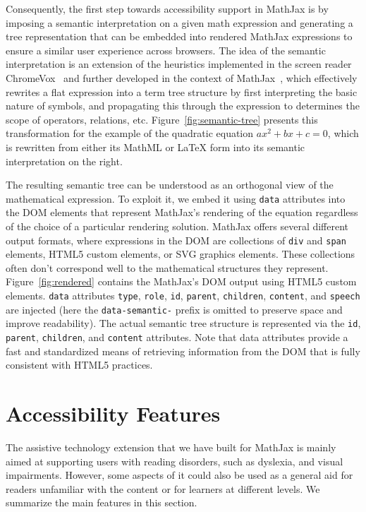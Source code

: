 \documentclass{sig-alternate}
\begin{document}
Consequently, the first step towards accessibility support in MathJax is by
imposing a semantic interpretation on a given math expression and generating a
tree representation that can be embedded into rendered MathJax expressions to
ensure a similar user experience across browsers. The idea of the semantic
interpretation is an extension of the heuristics implemented in the screen
reader ChromeVox~\cite{Sorge14} and further developed in the context of
MathJax~\cite{cervone2016towards}, which effectively rewrites a flat expression
into a term tree structure by first interpreting the basic nature of symbols, and
propagating this through the expression to determines the scope of operators,
relations, etc. Figure~\ref{fig:semantic-tree} presents this transformation for
the example of the quadratic equation $ax^2 + bx + c = 0$, which is rewritten
from either its MathML or {\LaTeX} form into its semantic interpretation on the
right.

The resulting semantic tree can be understood as an orthogonal view of the
mathematical expression. To exploit it, we embed it using \texttt{data}
attributes into the DOM elements that represent MathJax's rendering of the
equation regardless of the choice of a particular rendering solution. MathJax
offers several different output formats, where expressions in the DOM are
collections of \texttt{div} and \texttt{span} elements, HTML5 custom elements,
or SVG graphics elements. These collections often don't correspond well to the
mathematical structures they represent.  Figure~\ref{fig:rendered} contains the
MathJax's DOM output using HTML5 custom elements. \texttt{data} attributes
\texttt{type}, \texttt{role}, \texttt{id}, \texttt{parent}, \texttt{children},
\texttt{content}, and \texttt{speech} are injected (here the
\texttt{data-semantic-} prefix is omitted to preserve space and improve
readability). The actual semantic tree structure is represented via the
\texttt{id}, \texttt{parent}, \texttt{children}, and \texttt{content}
attributes. Note that data attributes provide a fast and standardized means of
retrieving information from the DOM that is fully consistent with HTML5
practices.


\section{Accessibility Features}
\label{sec:at-solution}

The assistive technology extension that we have built for MathJax is mainly
aimed at supporting users with reading disorders, such as dyslexia, and visual
impairments. However, some aspects of it could also be used as a general aid for
readers unfamiliar with the content or for learners at different levels. We
summarize the main features in this section.
\end{document}
